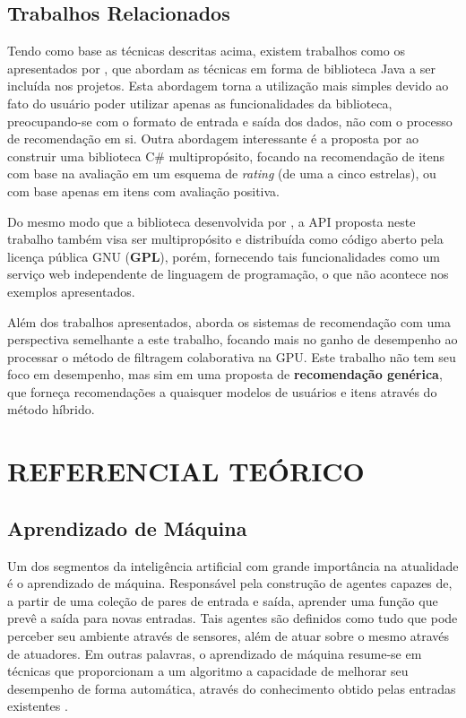 \documentclass[12pt, openright, oneside, a4paper, brazil]{abntex2}
\begin{document}
\section{Trabalhos Relacionados}

Tendo como base as técnicas descritas acima, existem trabalhos como os apresentados por , que abordam as técnicas em forma de biblioteca Java a ser incluída nos projetos. Esta abordagem torna a utilização mais simples devido ao fato do usuário poder utilizar apenas as funcionalidades da biblioteca, preocupando-se com o formato de entrada e saída dos dados, não com o processo de recomendação em si. Outra abordagem interessante é a proposta por  ao construir uma biblioteca C\# multipropósito, focando na recomendação de itens com base na avaliação em um esquema de \textit{rating} (de uma a cinco estrelas), ou com base apenas em itens com avaliação positiva.

Do mesmo modo que a biblioteca desenvolvida por , a API proposta neste trabalho também visa ser multipropósito e distribuída como código aberto pela licença pública GNU (\textbf{GPL}), porém, fornecendo tais funcionalidades como um serviço web independente de linguagem de programação, o que não acontece nos exemplos apresentados.

Além dos trabalhos apresentados,  aborda os sistemas de recomendação com uma perspectiva semelhante a este trabalho, focando mais no ganho de desempenho ao processar o método de filtragem colaborativa na GPU. Este trabalho não tem seu foco em desempenho, mas sim em uma proposta de \textbf{recomendação genérica}, que forneça recomendações a quaisquer modelos de usuários e itens através do método híbrido.

%
%

\cleardoublepage

\chapter{REFERENCIAL TEÓRICO}

\section{Aprendizado de Máquina}

Um dos segmentos da inteligência artificial com grande importância na atualidade é o aprendizado de máquina. Responsável pela construção de agentes capazes de, a partir de uma coleção de pares de entrada e saída, aprender uma função que prevê a saída para novas entradas. Tais agentes são definidos como tudo que pode perceber seu ambiente através de sensores, além de atuar sobre o mesmo através de atuadores. Em outras palavras, o aprendizado de máquina resume-se em técnicas que proporcionam a um algoritmo a capacidade de melhorar seu desempenho de forma automática, através do conhecimento obtido pelas entradas existentes \cite{coppin2015inteligencia}.
\end{document}
